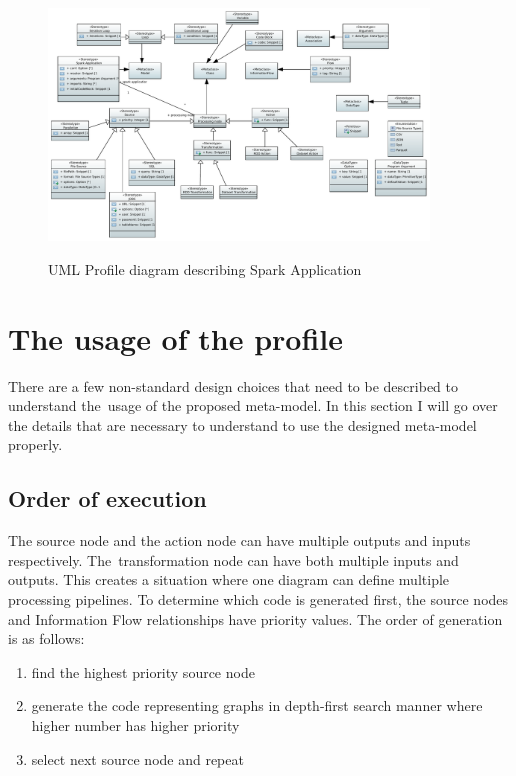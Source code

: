 \begin{figure}[H]
\includegraphics[angle=90,width=0.90\textwidth]{obrazky-figures/meta-model-diagram.pdf}
\label{fig:spark-profile}
\caption{UML Profile diagram describing Spark Application}
\centering
\end{figure}


\section{The usage of the profile}

There are a few non-standard design choices that need to be described to understand the~usage of the proposed meta-model. In this section I will go over the details that are necessary to understand to use the designed meta-model properly. 

\subsection*{Order of execution}

The source node and the action node can have multiple outputs and inputs respectively. The~transformation node can have both multiple inputs and outputs. This creates a situation where one diagram can define multiple processing pipelines. To determine which code is generated first, the source nodes and Information Flow relationships have priority values. The order of generation is as follows: 
\begin{enumerate}
    \item find the highest priority source node
    \item generate the code representing graphs in depth-first search manner where higher number has higher priority
    \item select next source node and repeat
\end{enumerate}

